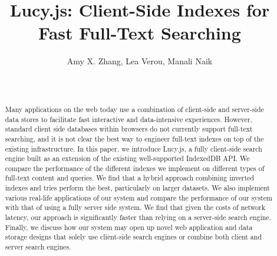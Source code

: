 \documentclass{vldb}
\begin{document}

\title{Lucy.js: Client-Side Indexes for Fast Full-Text Searching}




\author{
\alignauthor Amy X. Zhang, Lea Verou, Manali Naik\\
\vspace{.2cm}
	\\
	 \\
}

\maketitle

\begin{abstract}

Many applications on the web today use a combination of client-side and server-side data stores to facilitate fast interactive and data-intensive experiences. 
However, standard client side databases within browsers do not currently support full-text searching, and it is not clear the best way to engineer full-text indexes on top of the existing infrastructure.
In this paper, we introduce Lucy.js, a fully client-side search engine built as an extension of the existing well-supported IndexedDB API.
We compare the performance of the different indexes we implement on different types of full-text content and queries. We find that a hybrid approach combining inverted indexes and tries perform the best, particularly on larger datasets.
We also implement various real-life applications of our system and compare the performance of our system with that of using a fully server side system. We find that given the costs of network latency, our approach is significantly faster than relying on a server-side search engine.
Finally, we discuss how our system may open up novel web application and data storage designs that solely use client-side search engines or combine both client and server search engines.
\end{abstract}
\end{document}
